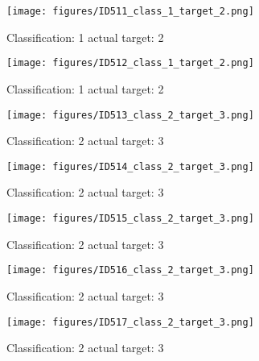 \begin{figure}[h!]
\begin{center}
\texttt{[image: figures/ID511\_class\_1\_target\_2.png]}
\end{center}
\caption{ Classification: 1 actual target: 2}
\label{fig:ID511_class_1_target_2}
\end{figure}
\begin{figure}[h!]
\begin{center}
\texttt{[image: figures/ID512\_class\_1\_target\_2.png]}
\end{center}
\caption{ Classification: 1 actual target: 2}
\label{fig:ID512_class_1_target_2}
\end{figure}
\begin{figure}[h!]
\begin{center}
\texttt{[image: figures/ID513\_class\_2\_target\_3.png]}
\end{center}
\caption{ Classification: 2 actual target: 3}
\label{fig:ID513_class_2_target_3}
\end{figure}
\begin{figure}[h!]
\begin{center}
\texttt{[image: figures/ID514\_class\_2\_target\_3.png]}
\end{center}
\caption{ Classification: 2 actual target: 3}
\label{fig:ID514_class_2_target_3}
\end{figure}
\begin{figure}[h!]
\begin{center}
\texttt{[image: figures/ID515\_class\_2\_target\_3.png]}
\end{center}
\caption{ Classification: 2 actual target: 3}
\label{fig:ID515_class_2_target_3}
\end{figure}
\begin{figure}[h!]
\begin{center}
\texttt{[image: figures/ID516\_class\_2\_target\_3.png]}
\end{center}
\caption{ Classification: 2 actual target: 3}
\label{fig:ID516_class_2_target_3}
\end{figure}
\begin{figure}[h!]
\begin{center}
\texttt{[image: figures/ID517\_class\_2\_target\_3.png]}
\end{center}
\caption{ Classification: 2 actual target: 3}
\label{fig:ID517_class_2_target_3}
\end{figure}
